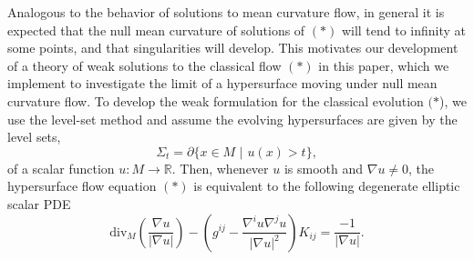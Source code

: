 \documentclass[11pt]{amsart}
\begin{document}
Analogous to the behavior of solutions to mean curvature flow, in general it is expected that the null mean curvature of solutions of $(*)$ will tend to infinity at some points, and that singularities will develop. This motivates our development of a theory of weak solutions to the classical flow $(*)$ in this paper, which we implement to investigate the limit of a hypersurface moving under null mean curvature flow.
To develop the weak formulation for the classical evolution $(*$), we use the level-set method and assume the evolving hypersurfaces are given by the level sets,
\begin{equation}\label{levelset1}\Sigma_{t}= \partial\{ x\in M \,\, \big| \,\, u(x)>t \}, \end{equation}
of a scalar function $u:M\rightarrow\mathbb{R}$. Then, whenever $u$ is smooth and $\nabla u\neq0$, the hypersurface flow equation $(*)$ is equivalent to the following degenerate elliptic scalar PDE
\[\tag{$**$}
 \mbox{div}_M\left( \frac{\nabla u}{|\nabla u|}\right) -\left(g^{ij}-\dfrac{\nabla^iu\nabla^ju}{|\nabla u|^2}\right)K_{ij}= \frac{-1}{|\nabla u|}.
\]
\end{document}
